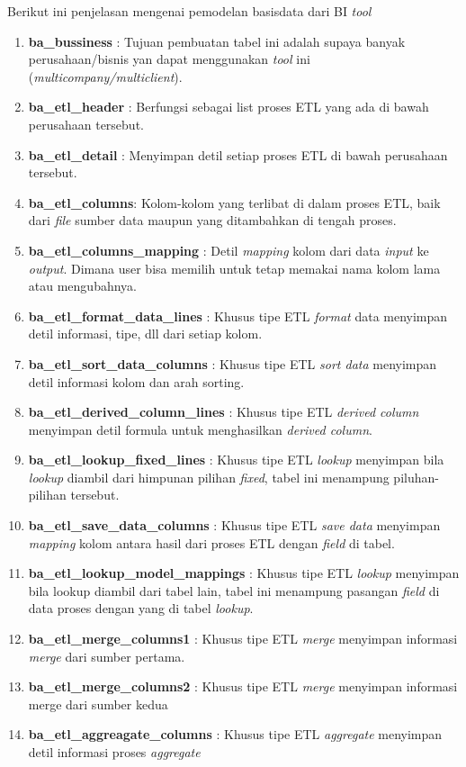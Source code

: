 Berikut ini penjelasan mengenai pemodelan basisdata dari BI \textit{tool}
\begin{enumerate}
	\item \textbf{ba\_bussiness} : Tujuan pembuatan tabel ini adalah supaya banyak perusahaan/bisnis yan dapat menggunakan \textit{tool} ini (\textit{multicompany/multiclient}).
	\item \textbf{ba\_etl\_header} : Berfungsi sebagai list proses ETL yang ada di bawah perusahaan tersebut.
	\item \textbf{ba\_etl\_detail} : Menyimpan detil setiap proses ETL di bawah perusahaan tersebut.
	\item \textbf{ba\_etl\_columns}: Kolom-kolom yang terlibat di dalam proses ETL, baik dari \textit{file} sumber data maupun yang ditambahkan di tengah proses.
	\item \textbf{ba\_etl\_columns\_mapping} : Detil \textit{mapping} kolom dari data \textit{input} ke \textit{output}. Dimana user bisa memilih untuk tetap memakai nama kolom lama atau mengubahnya.
	\item \textbf{ba\_etl\_format\_data\_lines} : Khusus tipe ETL \textit{format} data menyimpan detil informasi, tipe, dll dari setiap kolom.
	\item \textbf{ba\_etl\_sort\_data\_columns} : Khusus tipe ETL \textit{sort data} menyimpan detil informasi kolom dan arah sorting.
	\item \textbf{ba\_etl\_derived\_column\_lines} : Khusus tipe ETL \textit{derived column} menyimpan detil formula untuk menghasilkan \textit{derived column}.
	\item \textbf{ba\_etl\_lookup\_fixed\_lines} : Khusus tipe ETL \textit{lookup} menyimpan bila \textit{lookup} diambil dari himpunan pilihan \textit{fixed}, tabel ini menampung piluhan-pilihan tersebut.
	\item \textbf{ba\_etl\_save\_data\_columns} : Khusus tipe ETL \textit{save data} menyimpan \textit{mapping} kolom antara hasil dari proses ETL dengan \textit{field} di tabel.
	\item \textbf{ba\_etl\_lookup\_model\_mappings} : Khusus tipe ETL \textit{lookup} menyimpan bila lookup diambil dari tabel lain, tabel ini menampung pasangan \textit{field} di data proses dengan yang di tabel \textit{lookup}.
	\item \textbf{ba\_etl\_merge\_columns1} : Khusus tipe ETL \textit{merge} menyimpan informasi \textit{merge} dari sumber pertama.
	\item \textbf{ba\_etl\_merge\_columns2} : Khusus tipe ETL \textit{merge} menyimpan informasi merge dari sumber kedua
	\item \textbf{ba\_etl\_aggreagate\_columns} : Khusus tipe ETL \textit{aggregate} menyimpan detil informasi proses \textit{aggregate} 
	
\end{enumerate}




















	
